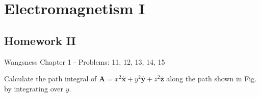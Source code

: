 \documentclass[crop=false,class=article,oneside]{standalone}
\begin{document}
    \ifx\ifphysicscourseselectromagnetismI\undefined
        \section*{Electromagnetism I}
        \setcounter{section}{2}
        \renewcommand\thesubfigure{%
            \arabic{section}.\arabic{figure}.\arabic{subfigure}%
        }
    \fi    
    \subsection{Homework II}
        Wangsness Chapter 1 - Problems: 11, 12, 13, 14, 15
        \begin{problem}[Wangsness 1-11]
            \label{problem:EMAG_1_Wangsness_1_11}
            Calculate the path integral of
            $\mathbf{A}=x^{2}\hat{\mathbf{x}}
            +y^{2}\hat{\mathbf{y}}+z^{2}\hat{\mathbf{z}}$
            along the path shown in Fig.~
            by integrating over $y$.
        \end{problem}
\end{document}
